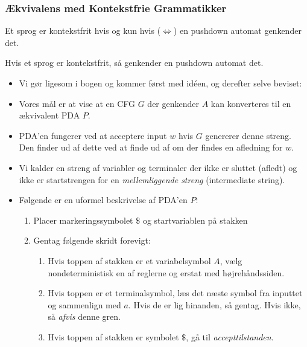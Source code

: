 \begin{frame}[allowframebreaks]
	\frametitle{Ækvivalens med Kontekstfrie Grammatikker}
	\begin{theorem}
		Et sprog er kontekstfrit hvis og kun hvis ($\iff$) en pushdown automat genkender det.
	\end{theorem}

	\begin{lemma}
		Hvis et sprog er kontekstfrit, så genkender en pushdown automat det.
	\end{lemma}

	\begin{itemize}
		\item Vi gør ligesom i bogen og kommer først med idéen, og derefter selve beviset:
		\item Vores mål er at vise at en CFG $G$ der genkender $A$ kan konverteres til en ækvivalent PDA $P$.
		\item PDA'en fungerer ved at acceptere input $w$ hvis $G$ genererer denne streng. Den finder ud af dette ved at finde ud af om der findes en afledning for $w$.
		\item Vi kalder en streng af variabler og terminaler der ikke er sluttet (afledt) og ikke er startstrengen for en \textit{mellemliggende streng} (intermediate string).
		\item Følgende er en uformel beskrivelse af PDA'en $P$:
		      \begin{enumerate}
			      \item Placer markeringssymbolet $\mathdollar$ og startvariablen på stakken
			      \item Gentag følgende skridt forevigt:
			            \begin{enumerate}
				            \item Hvis toppen af stakken er et variabelsymbol $A$, vælg nondeterministisk en af reglerne og erstat med højrehåndssiden.
				            \item Hvis toppen er et terminalsymbol, læs det næste symbol fra inputtet og sammenlign med $a$. Hvis de er lig hinanden, så gentag. Hvis ikke, så \textit{afvis} denne gren.
				            \item Hvis toppen af stakken er symbolet $\mathdollar$, gå til \textit{accepttilstanden}.
			            \end{enumerate}
		      \end{enumerate}


\end{itemize}
\end{frame}
